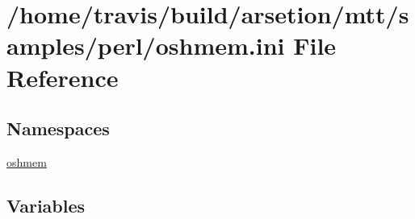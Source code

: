 \hypertarget{oshmem_8ini}{\section{/home/travis/build/arsetion/mtt/samples/perl/oshmem.ini File Reference}
\label{oshmem_8ini}
}
\subsection*{Namespaces}
\begin{DoxyCompactItemize}
\item 
\hyperlink{namespaceoshmem}{oshmem}
\end{DoxyCompactItemize}
\subsection*{Variables}
